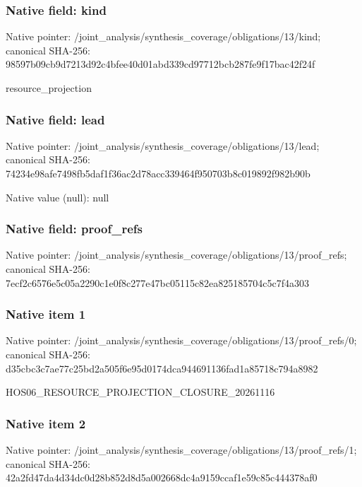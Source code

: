 \documentclass[10pt,a4paper]{article}
\begin{document}
\subsubsection{Native field: kind}
Native pointer: /joint\_\allowbreak{}analysis/synthesis\_\allowbreak{}coverage/obligations/13/kind; canonical SHA-256: 98597b09cb9d7213d92c4bfee40d01abd339cd97712bcb287fe9f17bac42f24f

\begingroup\raggedright\sloppy resource\_\allowbreak{}projection\par\endgroup

\subsubsection{Native field: lead}
Native pointer: /joint\_\allowbreak{}analysis/synthesis\_\allowbreak{}coverage/obligations/13/lead; canonical SHA-256: 74234e98afe7498fb5daf1f36ac2d78acc339464f950703b8c019892f982b90b

Native value (null): null

\subsubsection{Native field: proof\_\allowbreak{}refs}
Native pointer: /joint\_\allowbreak{}analysis/synthesis\_\allowbreak{}coverage/obligations/13/proof\_\allowbreak{}refs; canonical SHA-256: 7ecf2c6576e5c05a2290c1e0f8c277e47bc05115c82ea825185704c5c7f4a303

\subsubsection{Native item 1}
Native pointer: /joint\_\allowbreak{}analysis/synthesis\_\allowbreak{}coverage/obligations/13/proof\_\allowbreak{}refs/0; canonical SHA-256: d35cbc3c7ae77c25bd2a505f6e95d0174dca944691136fad1a85718c794a8982

\begingroup\raggedright\sloppy HOS06\_\allowbreak{}RESOURCE\_\allowbreak{}PROJECTION\_\allowbreak{}CLOSURE\_\allowbreak{}20261116\par\endgroup

\subsubsection{Native item 2}
Native pointer: /joint\_\allowbreak{}analysis/synthesis\_\allowbreak{}coverage/obligations/13/proof\_\allowbreak{}refs/1; canonical SHA-256: 42a2fd47da4d34dc0d28b852d8d5a002668dc4a9159ccaf1e59c85c444378af0
\end{document}
